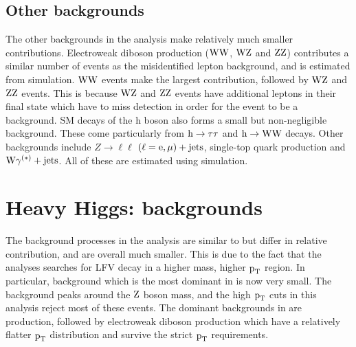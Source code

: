 \subsection{Other backgrounds}
\label{h125_other_bg}
The other backgrounds in the analysis make relatively much smaller contributions. Electroweak diboson production ($\text{W}\text{W}$, $\text{W}\text{Z}$ and $\text{Z}\text{Z}$) contributes a similar number of events as the misidentified lepton background, and is estimated from simulation. $\text{W}\text{W}$ events make the largest contribution, followed by $\text{W}\text{Z}$ and $\text{Z}\text{Z}$ events. This is because $\text{W}\text{Z}$ and $\text{Z}\text{Z}$ events  have additional leptons in their final state which have to miss detection in order for the event to be a background. SM decays of the h boson also forms a small but non-negligible background. These come particularly from $\text{h} \to \tau\tau$  and $\text{h} \to \text{W}\text{W}$ decays. Other backgrounds include $Z\to\ell\ell$ $(\ell = \text{e}, \mu)+\text{jets}$, single-top quark production and $\text{W}\gamma^{(*)}+\text{jets}$. All of these are estimated using simulation.  

\section{Heavy Higgs: \Hmue backgrounds }
\label{H_bg_val}
The background processes in the \Hmue analysis are  similar  to \hmue but differ in relative contribution, and are overall much smaller. This is due to the fact that the \Hmue analyses searches for LFV decay in a higher mass, higher $\text{p}_\text{T}$ region. In particular, \ztt background which is the most dominant in \hmue is now very small. The \ztt background peaks around the $\text{Z}$ boson mass, and the  high $\text{p}_\text{T}$ cuts in this analysis reject most of these events. The dominant backgrounds in \Hmue are \ttb production, followed by electroweak diboson production which have a relatively flatter $\text{p}_\text{T}$ distribution and survive the strict $\text{p}_\text{T}$ requirements.

